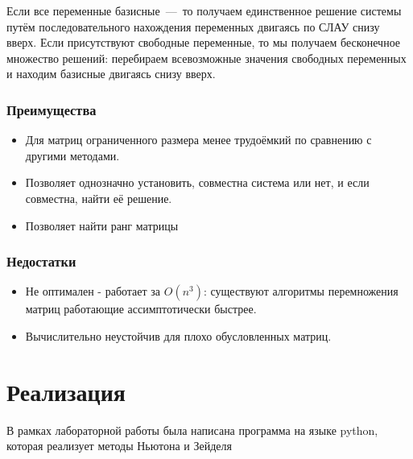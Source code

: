 \documentclass[12pt,a4paper,oneside]{extarticle}
\begin{document}
\begin{enumerate}
                Если все переменные базисные~---~то получаем единственное решение системы путём последовательного нахождения переменных двигаясь по СЛАУ снизу вверх. Если присутствуют свободные переменные, то мы получаем бесконечное множество решений: перебираем всевозможные значения свободных переменных и находим базисные двигаясь снизу вверх.
        \end{enumerate}

        \subsubsection{Преимущества}
            \begin{itemize}
                \item Для матриц ограниченного размера менее трудоёмкий по сравнению с другими методами.
                \item Позволяет однозначно установить, совместна система или нет, и если совместна, найти её решение.
                \item Позволяет найти ранг матрицы
            \end{itemize}
        \subsubsection{Недостатки}
            \begin{itemize}
                \item Не оптимален - работает за $O(n^3)$: существуют алгоритмы перемножения матриц работающие ассимптотически быстрее.
                \item Вычислительно неустойчив для плохо обусловленных матриц.
            \end{itemize}

\section{Реализация}
    В рамках лабораторной работы была написана программа на языке python, которая реализует методы Ньютона и Зейделя
\end{document}
